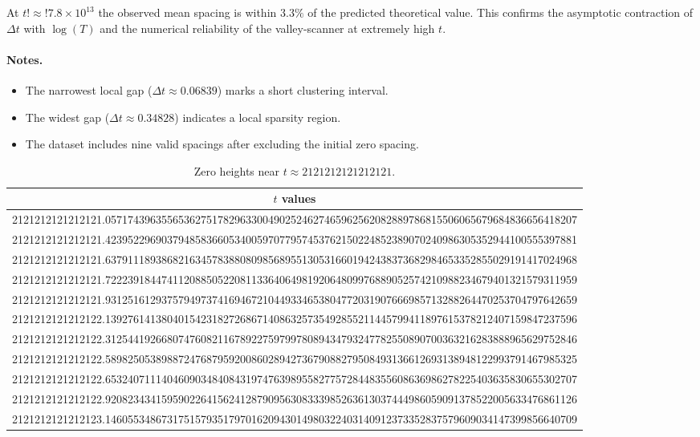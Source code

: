\documentclass[11pt,a4paper]{article}
\begin{document}
\noindent
At $t!\approx!7.8\times10^{13}$ the observed mean spacing is within $3.3\%$ of the predicted theoretical value. This confirms the asymptotic contraction of $\Delta t$ with $\log(T)$ and the numerical reliability of the valley-scanner at extremely high $t$.

\paragraph{Notes.}
\begin{itemize}
\item The narrowest local gap ($\Delta t \approx 0.06839$) marks a short clustering interval.
\item The widest gap ($\Delta t \approx 0.34828$) indicates a local sparsity region.
\item The dataset includes nine valid spacings after excluding the initial zero spacing.
\end{itemize}


\begin{table}[H]
\centering
\small
\caption{Zero heights near $t \approx 2121212121212121$.}
\begin{tabular}{c}
\hline
\textbf{$t$ values} \\
\hline
2121212121212121.057174396355653627517829633004902524627465962562082889786815506065679684836656418207 \\
2121212121212121.423952296903794858366053400597077957453762150224852389070240986305352944100555397881 \\
2121212121212121.637911189386821634578388080985689551305316601942438373682984653352855029191417024968 \\
2121212121212121.722239184474112088505220811336406498192064809976889052574210988234679401321579311959 \\
2121212121212121.931251612937579497374169467210449334653804772031907666985713288264470253704797642659 \\
2121212121212122.139276141380401542318272686714086325735492855211445799411897615378212407159847237596 \\
2121212121212122.312544192668074760821167892275979978089434793247782550890700363216283888965629752846 \\
2121212121212122.589825053898872476879592008602894273679088279508493136612693138948122993791467985325 \\
2121212121212122.653240711140460903484084319747639895582775728448355608636986278225403635830655302707 \\
2121212121212122.920823434159590226415624128790956308333985263613037444986059091378522005633476861126 \\
2121212121212123.146055348673175157935179701620943014980322403140912373352837579609034147399856640709 \\
\hline
\end{tabular}
\label{tab:t_values_2121212121212121}
\end{table}
\end{document}
